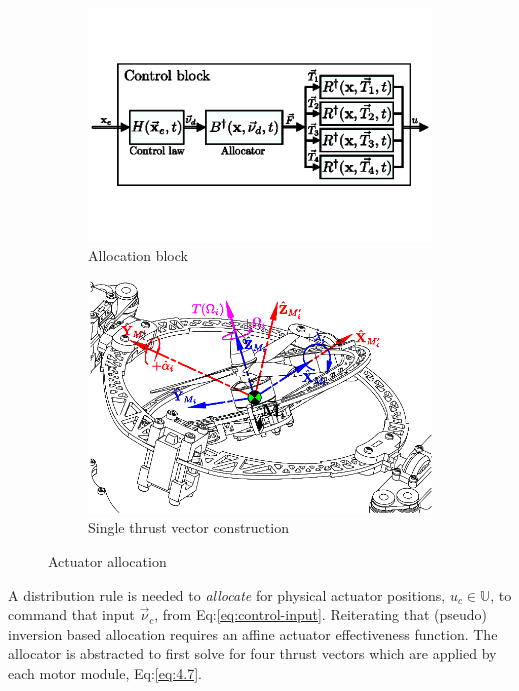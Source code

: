 \begin{figure}[htbp]
\vspace{-8pt}
\centering
\begin{subfigure}{0.49\textwidth}
\centering
\includegraphics[width=\textwidth]{figs/allocator-block}
\caption{Allocation block}
\label{fig:allocation-block}
\end{subfigure}
\begin{subfigure}{0.49\textwidth}
\centering
\includegraphics[width=\textwidth]{figs/force-redirect}
\caption{Single thrust vector construction}
\label{fig:allocation-redirect}
\end{subfigure}
\vspace{-10pt}
\caption{Actuator allocation}
\vspace{-16pt}
\end{figure}
\par
A distribution rule is needed to \emph{allocate} for physical actuator positions, $u_c\in\mathbb{U}$, to command that input $\vec{\nu}_c$, from Eq:\ref{eq:control-input}. Reiterating that (pseudo) inversion based allocation requires an affine actuator effectiveness function. The allocator is abstracted to first solve for four thrust vectors which are applied by each motor module, Eq:\ref{eq:4.7}.
